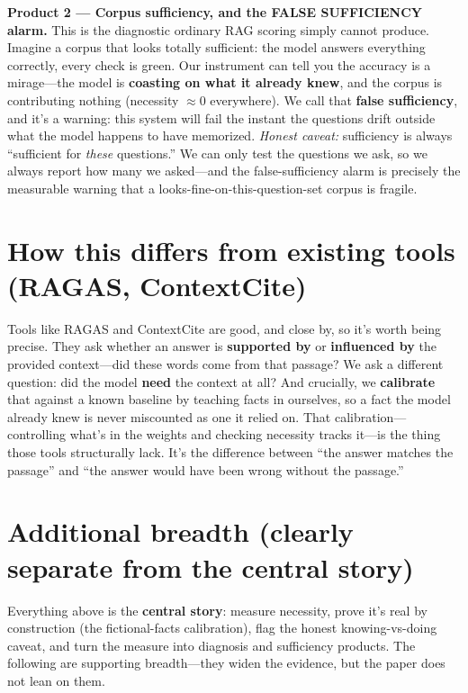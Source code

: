 \documentclass[11pt]{article}
\begin{document}
\textbf{Product 2 --- Corpus sufficiency, and the FALSE SUFFICIENCY alarm.} This is the
diagnostic ordinary RAG scoring simply cannot produce. Imagine a corpus that looks totally
sufficient: the model answers everything correctly, every check is green. Our instrument can tell
you the accuracy is a mirage---the model is \textbf{coasting on what it already knew}, and the
corpus is contributing nothing (necessity $\approx$0 everywhere). We call that \textbf{false
sufficiency}, and it's a warning: this system will fail the instant the questions drift outside
what the model happens to have memorized. \emph{Honest caveat:} sufficiency is always ``sufficient
for \emph{these} questions.'' We can only test the questions we ask, so we always report how many
we asked---and the false-sufficiency alarm is precisely the measurable warning that a
looks-fine-on-this-question-set corpus is fragile.

\section*{How this differs from existing tools (RAGAS, ContextCite)}

Tools like RAGAS and ContextCite are good, and close by, so it's worth being precise. They ask
whether an answer is \textbf{supported by} or \textbf{influenced by} the provided context---did
these words come from that passage? We ask a different question: did the model \textbf{need} the
context at all? And crucially, we \textbf{calibrate} that against a known baseline by teaching
facts in ourselves, so a fact the model already knew is never miscounted as one it relied on.
That calibration---controlling what's in the weights and checking necessity tracks it---is the
thing those tools structurally lack. It's the difference between ``the answer matches the
passage'' and ``the answer would have been wrong without the passage.''

\section*{Additional breadth (clearly separate from the central story)}

Everything above is the \textbf{central story}: measure necessity, prove it's real by construction
(the fictional-facts calibration), flag the honest knowing-vs-doing caveat, and turn the measure
into diagnosis and sufficiency products. The following are supporting breadth---they widen the
evidence, but the paper does not lean on them.
\end{document}
